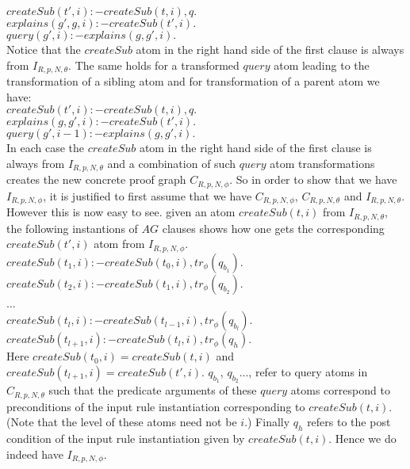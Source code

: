 $createSub(t',i):-createSub(t,i),q.$\\
$explains(g',g,i):-createSub(t',i).$\\
$query(g',i):-explains(g,g',i).$\\
Notice that the $createSub$ atom in the right hand side of the first clause is always from $I_{R,p,N,\theta}$. The same holds for a transformed $query$ atom leading to the transformation of a sibling atom and for transformation of a parent atom we have:\\
$createSub(t',i):-createSub(t,i),q.$\\
$explains(g,g',i):-createSub(t',i).$\\
$query(g',i-1):-explains(g,g',i).$\\
In each case the $createSub$ atom in the right hand side of the first clause is always from $I_{R,p,N,\theta}$ and a combination of such $query$ atom transformations creates the new concrete proof graph $C_{R,p,N,\phi}$. So in order to show that we have $I_{R,p,N,\phi}$, it is justified to first assume that we have $C_{R,p,N,\phi}$, $C_{R,p,N,\theta}$ and $I_{R,p,N,\theta}$. However this is now easy to see. given an atom $createSub(t,i)$ from $I_{R,p,N,\theta}$, the following instantions of $AG$ clauses shows how one gets the corresponding $createSub(t',i)$ atom from $I_{R,p,N,\phi}$.\\
$createSub(t_{1},i):-createSub(t_{0},i),tr_{\phi}(q_{b_{1}}).$\\
$createSub(t_{2},i):-createSub(t_{1},i),tr_{\phi}(q_{b_{2}}).$\\ ...\\
$createSub(t_{l},i):-createSub(t_{l-1},i),tr_{\phi}(q_{b_{l}}).$\\
$createSub(t_{l+1},i):-createSub(t_{l},i),tr_{\phi}(q_{h}).$\\
Here $createSub(t_{0},i) = createSub(t,i)$ and $createSub(t_{l+1},i) = createSub(t',i)$. $q_{b_{1}}$, $q_{b_{2}}$..., refer to query atoms in $C_{R,p,N,\theta}$  such that the predicate arguments of these $query$ atoms correspond to preconditions of the input rule instantiation corresponding to $createSub(t,i)$. (Note that the level of these atoms need not be $i$.) Finally $q_{h}$ refers to the post condition of the input rule instantiation given by $createSub(t,i)$. Hence we do indeed have $I_{R,p,N,\phi}$.

%


